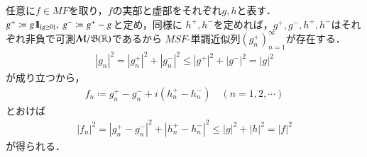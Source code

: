 	\begin{prf}
		任意に$f \in MF$を取り，$f$の実部と虚部をそれぞれ$g,h$と表す．
		$g^+ \coloneqq g \mbox{1}\hspace{-0.25em}\mbox{l}_{\{g \geq 0\}},\ g^- \coloneqq g^+ - g$と定め，同様に
		$h^+,h^-$を定めれば，$g^+,g^-,h^+,h^-$はそれぞれ非負で可測$\mathcal{M}/\mathfrak{B}(\mathbb{R})$であるから
		$MSF$-単調近似列$\left( g^+_n \right)_{n=1}^{\infty}$が存在する．
		\begin{align}
			\left| g_n \right|^2 = \left| g^+_n \right|^2 + \left| g^-_n \right|^2
			\leq \left| g^+ \right|^2 + \left| g^- \right|^2
			= |g|^2
		\end{align}
		が成り立つから，
		\begin{align}
			f_n \coloneqq g^+_n - g^-_n + i\left( h^+_n - h^-_n \right)
			\quad (n=1,2,\cdots)
		\end{align}
		とおけば
		\begin{align}
			|f_n|^2 = \left| g^+_n - g^-_n \right|^2 + \left| h^+_n - h^-_n \right|^2
			\leq |g|^2 + |h|^2
			= |f|^2
		\end{align}
		が得られる．
		\QED
	\end{prf}
	
